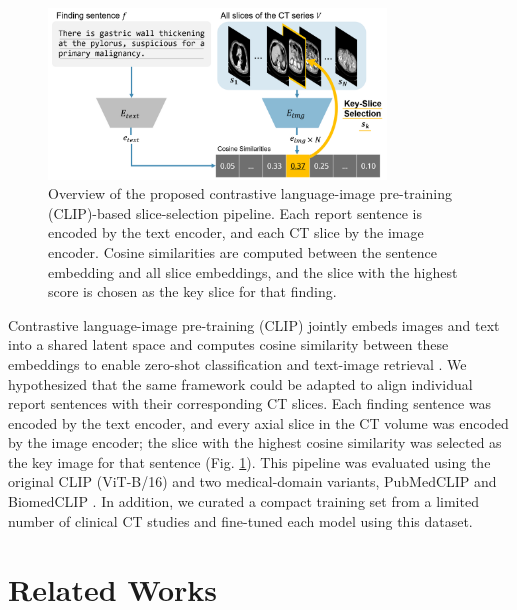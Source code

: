 \documentclass[bioengineering,article,submit,pdftex,moreauthors]{Definitions/mdpi}
\begin{document}
\begin{figure}[ht]
  \centering
  \includegraphics[width=0.8\textwidth]{./figures/figure1_9.png}
  \caption{
    Overview of the proposed contrastive language-image pre-training (CLIP)-based slice-selection pipeline. 
    Each report sentence is encoded by the text encoder, and each CT slice by the image encoder. 
    Cosine similarities are computed between the sentence embedding and all slice embeddings, and the slice with the highest score is chosen as the key slice for that finding. 
}
  \label{fig:clip_overview}
\end{figure}


Contrastive language-image pre-training (CLIP) jointly embeds images and text into a shared latent space and computes cosine similarity between these embeddings to enable zero-shot classiﬁcation and text-image retrieval \cite{radford_learning_2021}. 
We hypothesized that the same framework could be adapted to align individual report sentences with their corresponding CT slices. 
Each finding sentence was encoded by the text encoder, and every axial slice in the CT volume was encoded by the image encoder; the slice with the highest cosine similarity was selected as the key image for that sentence (Fig. \ref{fig:clip_overview}). 
This pipeline was evaluated using the original CLIP (ViT-B/16) and two medical-domain variants, PubMedCLIP and BiomedCLIP \cite{radford_learning_2021,eslami_pubmedclip_2023,zhang_biomedclip_2025}. 
In addition, we curated a compact training set from a limited number of clinical CT studies and fine-tuned each model using this dataset. 




\section{Related Works}
\end{document}
